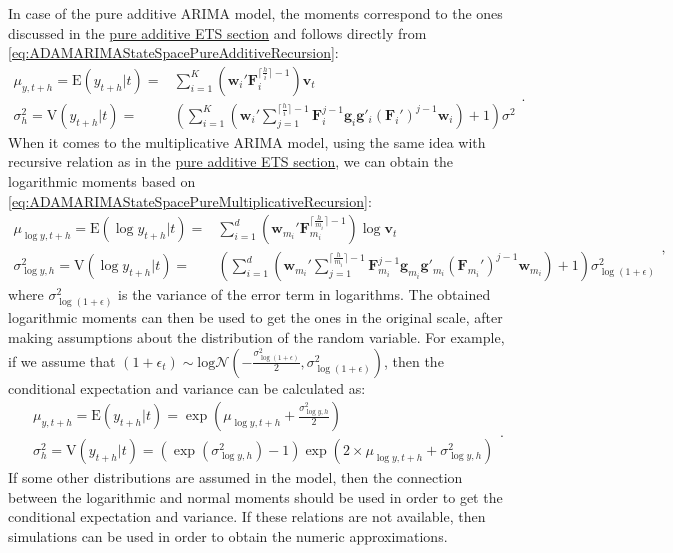 \documentclass[
]{book}
\theoremstyle{definition}
\theoremstyle{definition}
\theoremstyle{definition}
\theoremstyle{definition}
\theoremstyle{remark}
\begin{document}
In case of the pure additive ARIMA model, the moments correspond to the ones discussed in the \protect\hyperlink{ADAMETSPureAdditive}{pure additive ETS section} and follows directly from \eqref{eq:ADAMARIMAStateSpacePureAdditiveRecursion}:
\begin{equation*}
  \begin{aligned}
    \mu_{y,t+h} = \mathrm{E}(y_{t+h}|t) = & \sum_{i=1}^K \left(\mathbf{w}_{i}' \mathbf{F}_{i}^{\lceil\frac{h}{i}\rceil-1} \right) \mathbf{v}_{t} \\
    \sigma^2_{h} = \mathrm{V}(y_{t+h}|t) = & \left( \sum_{i=1}^K \left(\mathbf{w}_{i}' \sum_{j=1}^{\lceil\frac{h}{i}\rceil-1} \mathbf{F}_{i}^{j-1} \mathbf{g}_{i} \mathbf{g}'_{i} (\mathbf{F}_{i}')^{j-1} \mathbf{w}_{i} \right) + 1 \right) \sigma^2
  \end{aligned} .
\end{equation*}
When it comes to the multiplicative ARIMA model, using the same idea with recursive relation as in the \protect\hyperlink{adamETSPureAdditiveRecursive}{pure additive ETS section}, we can obtain the logarithmic moments based on \eqref{eq:ADAMARIMAStateSpacePureMultiplicativeRecursion}:
\begin{equation}
  \begin{aligned}
    \mu_{\log y,t+h} = \mathrm{E}(\log y_{t+h}|t) = & \sum_{i=1}^d \left(\mathbf{w}_{m_i}' \mathbf{F}_{m_i}^{\lceil\frac{h}{m_i}\rceil-1} \right) \log \mathbf{v}_{t} \\
    \sigma^2_{\log y,h} = \mathrm{V}(\log y_{t+h}|t) = & \left( \sum_{i=1}^d \left(\mathbf{w}_{m_i}' \sum_{j=1}^{\lceil\frac{h}{m_i}\rceil-1} \mathbf{F}_{m_i}^{j-1} \mathbf{g}_{m_i} \mathbf{g}'_{m_i} (\mathbf{F}_{m_i}')^{j-1} \mathbf{w}_{m_i} \right) + 1 \right) \sigma_{\log (1+\epsilon)}^2
  \end{aligned},
  \label{eq:ADAMARIMAMultiplicativeMomentsLogs}
\end{equation}
where \(\sigma_{\log (1+\epsilon)}^2\) is the variance of the error term in logarithms. The obtained logarithmic moments can then be used to get the ones in the original scale, after making assumptions about the distribution of the random variable. For example, if we assume that \(\left(1+\epsilon_t \right) \sim \mathrm{log}\mathcal{N}\left(-\frac{\sigma_{\log (1+\epsilon)}^2}{2}, \sigma_{\log (1+\epsilon)}^2\right)\), then the conditional expectation and variance can be calculated as:
\begin{equation}
  \begin{aligned}
    & \mu_{y,t+h} = \mathrm{E}(y_{t+h}|t) = \exp \left(\mu_{\log y,t+h} + \frac{\sigma^2_{\log y,h}}{2} \right) \\
    & \sigma^2_{h} = \mathrm{V}(y_{t+h}|t) = \left(\exp\left( \sigma^2_{\log y,h} \right) - 1 \right)\exp\left(2 \times \mu_{\log y,t+h} + \sigma^2_{\log y,h} \right)
  \end{aligned}.
  \label{eq:ADAMARIMAMultiplicativeMomentsLogN}
\end{equation}
If some other distributions are assumed in the model, then the connection between the logarithmic and normal moments should be used in order to get the conditional expectation and variance. If these relations are not available, then simulations can be used in order to obtain the numeric approximations.
\end{document}

